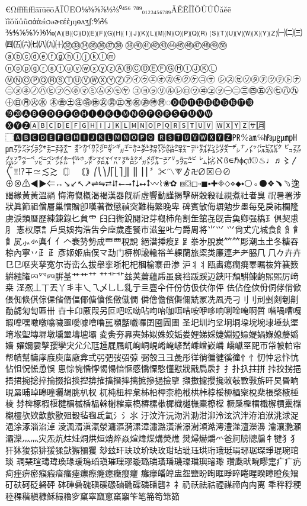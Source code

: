 €ΩﬀﬃﬄāīūēōĀĪŪĒŌ⅛⅜⅝⅞⅓⅔⁰⁴⁵⁶
⁷⁸⁹₀₁₂₃₄₅₆₇₈₉ǍĚẼǏĨǑǓŮŨǎěẽ
ǐĩǒǔůũɑάὰǽɔəɚɛέὲȷŋɵʌʒʃː↉⅖
⅗⅘⅙⅚⅐⅑⅒🄐🄑🄒🄓🄔🄕🄖🄗🄘🄙🄚🄛🄜🄝🄞🄟🄠🄡
🄢🄣🄤🄥🄦🄧🄨🄩㈠㈡㈢㈣㈤㈥㈦㈧㈨㈩㉜㉝㉞㉟㊱㊲㊳
㊴㊵㊶㊷㊸㊹㊺㊻㊼㊽㊾㊿ⓐⓑⓒⓓⓔⓕⓖⓗⓘⓙⓚⓛⓜ
ⓝⓞⓟⓠⓡⓢⓣⓤⓥⓦⓧⓨⓩⒶⒷⒸⒹⒺⒻⒼⒽⒾⒿⓀⓁ
ⓂⓃⓄⓅⓆⓇⓈⓉⓊⓋⓌⓍⓎⓏ㋐㋑㋒㋓㋔㋕㋖㋗㋘㋙㋚
㋛㋜㋝㋞㋟㋠㋡㋢㋣㋤㋥㋦㋧㋨㋩㋪㋫㋬㋭㋮㋯㋰㋱㋲㋳
㋴㋵㋶㋷㋸㋹㋺㋻㋼㋽㋾㊀㊁㊂㊃㊄㊅㊆㊇㊈㊉㊐㊊㊋㊌
㊍㊎㊏㊟㊠㊡㊛㊚㊣㊢㊗㊜㊕㉄◌⓿❿⓫⓬⓭⓮⓯⓰⓱⓲
⓳⓴🅐🅑🅒🅓🅔🅕🅖🅗🅘🅙🅚🅛🅜🅝🅞🅟🅠🅡🅢🅣🅤🅥🅦
🅧🅨🅩🄰🄱🄲🄳🄴🄵🄶🄷🄸🄹🄺🄻🄼🄽🄾🄿🅀🅁🅂🅃🅄🅅
🅆🅇🅈🅉🈂🈷⃞⬚🅰🅱🅲🅳🅴🅵🅶🅷🅸🅹🅺🅻🅼🅽🅾🅿🆀
🆁🆂🆃🆄🆅🆆🆇🆈🆉㏚℀㏂℅㍱㎍㎛㏗㏘㌁㌂㌄㌆㌈㌇㌊
㌉㌋㌌㌎㌏㌐㌑㌒㌓㌗㌙㌚㌛㌜㌝㌟㌠㌡㌤㌥㌨㌩㌭㌮㌯
㌰㌲㌴㌵㌼㌷㌸㌺㌽㍁㌾㌿㍀㍃㍄㍅㍆㍈㍋㍌㍏㍐㍒㍔㍓
㍕㍖ℵϐ∊ℏϕϛϑ⚾♨♩♬〻〳〴〵‼⁉∓≃≲≳〘〙
｟｠⎛⎝⎞⎠⎡⎣⎤⎦⎜⎟⎢⎥⎪〞✂〽⮗ゟ࿖∅⊠⊖⊘
⊕⊗⚠◀▶⇐↔↘↙↖↗⇌⇋⮂⮃⭠⭢⭡⭣⭤⭥〰⌇❀✿
⧈⛋◻▫◼▪✚🞜⬦⋄⬥⬩⚪◦⚫❖﹅﹆逸謁緣⿈黃溫禍
悔海慨槪渴褐漢器既祈虛響勤謹揭擊硏穀殺祉視煮社者臭
祝暑署涉狀眞節祖僧層巢憎贈卽嘆著徵懲禎突難梅繁晚卑
碑賓敏侮塀勉步墨每免戾祐欄隆虜淚類曆歷練鍊錄𠤎貟⻗
⺽𦥑𫟘銳閱沿芽槪杮⻆割𦈢舘㐂旣𠮷𩵋卿强𫞎⺩俱契恵⺼
憲权𠩤訁戶吳娛抅浩吿𫝆𫝷歲產䬸巿滋玺𠮟勺爵周将⺌𭕄
⺍尙𠀋宂城⻝⻟飠⻞𩙿㞍⺗㣺真⺅亻𠆢𮕩㔟𫝑成⻃覀稅說
絕澘揷瘦⻊𧾷𣳾㐧脫炭⺮𥫗彫潮圡𡈽冬糖吞㮈內寧丷⺪𤴔
彥姬姬庙㑨龴勐门𫞉栁諭輸𥙿⺷躶蘭旅鿄类廉連⺹耂𦚰⺇
𠘨𠂊𠦄卉⺋㔾呕夹孶寃尔㟢峦么拔𦦙挛晣𣏌杞槶榆𪧦毌渗
沪⺦丬瓯畵痬癎㾱睪瞩鿆筓𫞽䉤絣繈𮉸𠔿⺳𦉪腁䑓艹⺾艹
⺿艹⻀兹荚䔥藴𠂰虽㐮裆䟦𮛪迈𨦇𨸗頹騈鯟𫠚𤋮𤋮厉﨑桒
𣲾𠘑丄丅丟丫丯丰乀乁乄⺃乚乿亍亖亹仐仠份仿伋伕你伻
佉佔佺佽佾侗侾俏俽倀倁倐倛倧倮偗偦偪倻傏傖傜僌僦僩
僯儈儋儐儛儞兟冡冼凮凴刁⺉刂刓剉剡剦劓勈勰匊匋匾卌
卋卡卬厫叚另叵吧呍呦呫呴咍咖咡咭咹咿哆响唎唫唵啊啠
喈喎嘈嘎嘏嘷嘿噉噋噏噦噩噯噱噲嚕嚚嚬嚭嚱囉囝囤圊圕
圣圯圳圴坌坰垌垜垸埦埭埵埶埿堉堠堲塼墀墩壎壐壔壚壩
夌夤夯奡奭姊姒姝姣姤娄娌娣婇婕婣婭婾媞媧媬媳嫠嬀嬙
嬥嬭孁孼孾孿宊⺏尣尫尰屣屩屼峋峒峴崤崦嵃嵆嵊嶒嶔嶙
嶠巘巠巸帀帒帔帕帘帮幘幫幬庨庪庾庿廒弇弎弜弝弢弨弶
弻彀⼹彐彘彤徉徜徧徤徯徸⺖忄忉忡忩忭忼怗怚怳恡恿悞
悤悰惋惛惸愒愓愔愜慼憍憟憨懂懟戕戩扃扆⺘扌扑扖拄拼
挊挍挘挹捂捃捥捴捽掄掇掐掞揑揜搉搐搢摔摛摭摻撾撿擥
擷擻攄攖攙敇敧斁斅旂旰旲昬晌晛晜晡晫暤曈曬朅朓朳杈
杌杶杻枰枲柹柗柙柰栬栰栱桛桲桵桺梄梥梲棐棖棨棭棰棱
棼椑椓椵椻楗楣楲楿榀榦榭榷槖槗樁樏樕樨樴樾橅橐橑橖
橛檃檉檑檝檞檟櫜櫧櫬欞欤欵歆歖歠殂殾毡毱氐氳氵⺡⺢
汙汶汻沅沕沜泐泔泖泠泫泬泮洊洎洑洮浗浞浥涂涿淄淊淖
淩渢湑滇滊滎滽漚漪漯漳潚潞潢潽澋澍澒澔澚澧澨澶濚濞
瀹瀼灔灝灞灤⺣灬灾炁炕炷烓烔烘烜焇焠焱煊煒煠煹熒燋
燓燖爀爝爫爸牁牓牕牖牜犍⺨犭犴狇狻猄猅猨猱獃獬獼玃
玅玆玕玞玟玠玦玫玵玷玼珏珙珩珴珽琄琊琚琛琤琨琬琯琰
琱琹瑄瑇瑋瑍瑑瑗瑦瑫瑱璀璅璆璇璐璘璜璠璣璨璫璵璿瓈
瓚瓞畎畹疁疐⽧疒疓疴痤痹瘀瘊瘕瘖瘙瘞瘭瘵癃癋癥癭癯
癱癴皤皥盅盌盬盼眴眶睜睟睠睲睽瞕瞪矦矰矴砆砢砭砮砰
砵硨碞磈磌磎磤磠磡磲磷磻礱⺭礻礽祅祛祜禋禖禘⽱禸离
秊秚稃稉稑稞稭稹穅穌穝穭穸窠窣窳窻窼竆笇笔笧笱筇筎
